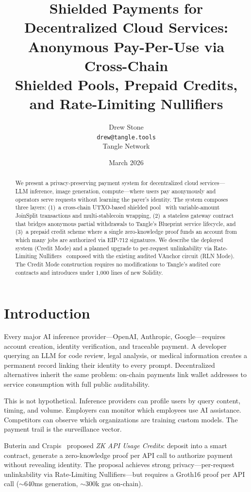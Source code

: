 \documentclass[11pt,a4paper]{article}
\title{Shielded Payments for Decentralized Cloud Services:\\Anonymous Pay-Per-Use via Cross-Chain\\Shielded Pools, Prepaid Credits, and Rate-Limiting Nullifiers}
\author{
  Drew Stone\\
  \texttt{drew@tangle.tools}\\
  Tangle Network
}
\date{March 2026}
\theoremstyle{definition}
\begin{document}
\maketitle

\begin{abstract}
We present a privacy-preserving payment system for decentralized cloud services---LLM inference, image generation, compute---where users pay anonymously and operators serve requests without learning the payer's identity. The system composes three layers: (1)~a cross-chain UTXO-based shielded pool~\cite{webb} with variable-amount JoinSplit transactions and multi-stablecoin wrapping, (2)~a stateless gateway contract that bridges anonymous partial withdrawals to Tangle's Blueprint service lifecycle, and (3)~a prepaid credit scheme where a single zero-knowledge proof funds an account from which many jobs are authorized via EIP-712 signatures. We describe the deployed system (Credit Mode) and a planned upgrade to per-request unlinkability via Rate-Limiting Nullifiers~\cite{rln} composed with the existing audited VAnchor circuit (RLN Mode). The Credit Mode construction requires no modifications to Tangle's audited core contracts and introduces under 1,000 lines of new Solidity.
\end{abstract}

\tableofcontents

\section{Introduction}

Every major AI inference provider---OpenAI, Anthropic, Google---requires account creation, identity verification, and traceable payment. A developer querying an LLM for code review, legal analysis, or medical information creates a permanent record linking their identity to every prompt. Decentralized alternatives inherit the same problem: on-chain payments link wallet addresses to service consumption with full public auditability.

This is not hypothetical. Inference providers can profile users by query content, timing, and volume. Employers can monitor which employees use AI assistance. Competitors can observe which organizations are training custom models. The payment trail is the surveillance vector.

Buterin and Crapis~\cite{zkapi} proposed \emph{ZK API Usage Credits}: deposit into a smart contract, generate a zero-knowledge proof per API call to authorize payment without revealing identity. The proposal achieves strong privacy---per-request unlinkability via Rate-Limiting Nullifiers---but requires a Groth16 proof per API call ($\sim$640ms generation, $\sim$300k gas on-chain).
\end{document}
